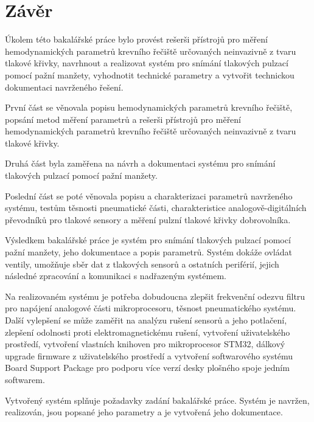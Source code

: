 \documentclass{ctuthesis}
\begin{document}
\chapter{Závěr}
Úkolem této bakalářské práce bylo provést rešerši přístrojů pro měření hemodynamických parametrů krevního řečiště určovaných neinvazivně z tvaru
tlakové křivky, navrhnout a realizovat systém pro snímání tlakových pulzací pomocí pažní manžety, vyhodnotit technické parametry a vytvořit technickou dokumentaci navrženého řešení.
\par
První část se věnovala popisu hemodynamických parametrů krevního řečiště, popsání metod měření parametrů a rešerši přístrojů pro měření hemodynamických parametrů krevního řečiště určovaných neinvazivně z tvaru
tlakové křivky.
\par
Druhá část byla zaměřena na návrh a dokumentaci systému pro snímání tlakových pulzací pomocí pažní manžety.
\par
Poslední část se poté věnovala popisu a charakterizaci parametrů navrženého systému, testům těsnosti pneumatické části, charakteristice analogově-digitálních převodníků pro tlakové sensory a měření pulzní tlakové křivky dobrovolníka.
\par
Výsledkem bakalářské práce je systém pro snímání tlakových pulzací pomocí pažní manžety, jeho dokumentace a popis parametrů. Systém dokáže ovládat ventily, umožňuje sběr dat z tlakových sensorů a ostatních periférií, jejich následné zpracování a komunikaci s nadřazeným systémem.
\par
Na realizovaném systému je potřeba dobudoucna zlepšit frekvenční odezvu filtru pro napájení analogové části mikroprocesoru, těsnost pneumatického systému. Další vylepšení se může zaměřit na analýzu rušení sensorů a jeho potlačení, zlepšení odolnosti proti elektromagnetickému rušení, vytvoření uživatelského prostředí, vytvoření vlastních knihoven pro
mikroprocesor STM32, dálkový upgrade firmware z uživatelského prostředí a vytvoření softwarového systému Board Support Package pro podporu více verzí desky plošného spoje jedním softwarem.
\par
Vytvořený systém splňuje požadavky zadání bakalářské práce. Systém je navržen, realizován, jsou popsané jeho parametry a je vytvořená jeho dokumentace.


\appendix

\printindex


\nocite{*}
% 



\end{document}
